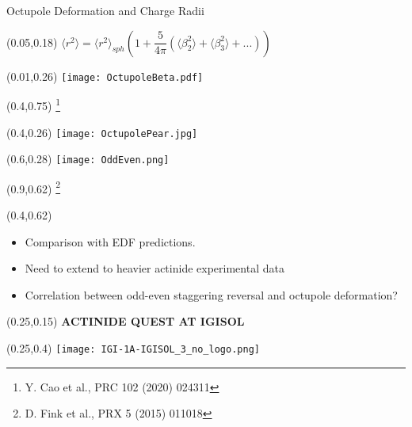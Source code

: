 \documentclass[10pt,aspectratio=169]{beamer}
\begin{document}
\begin{frame}{Octupole Deformation and Charge Radii}
	\begin{textblock*}{0.9\paperwidth}(0.05\paperwidth,0.18\paperheight)
		\centering
		$\langle r^2 \rangle = \langle r^2 \rangle_{sph} \left( 1+\dfrac{5}{4 \pi}\left( \langle \beta^2_2\rangle+\langle \beta^2_3\rangle+...\right)\right)$
	\end{textblock*}
	\begin{textblock*}{0.4\paperwidth}(0.01\paperwidth,0.26\paperheight)
		\texttt{[image: OctupoleBeta.pdf]}
	\end{textblock*}
	\begin{textblock*}{0.1\paperwidth}(0.4\paperwidth,0.75\paperheight)
		\footnote{Y. Cao et al., PRC 102 (2020) 024311}
	\end{textblock*}
	\begin{textblock*}{0.15\paperwidth}(0.4\paperwidth,0.26\paperheight)
		\texttt{[image: OctupolePear.jpg]}
	\end{textblock*}
	\begin{textblock*}{0.4\paperwidth}(0.6\paperwidth,0.28\paperheight)
		\texttt{[image: OddEven.png]}
	\end{textblock*}
	\begin{textblock*}{0.1\paperwidth}(0.9\paperwidth,0.62\paperheight)
		\footnote{D. Fink et al., PRX 5 (2015) 011018}
	\end{textblock*}
	\begin{textblock*}{0.6\paperwidth}(0.4\paperwidth,0.62\paperheight)
		\small	
		\begin{itemize}
				\item Comparison with EDF predictions. 
				\item Need to extend to heavier actinide experimental data
				\item Correlation between odd-even staggering reversal and octupole deformation?
			\end{itemize}
	\end{textblock*}
\end{frame}


\begin{SectionTitle}
	\begin{frame}
		\centering
		\begin{textblock*}{0.5\paperwidth}(0.25\paperwidth,0.15\paperheight)
			\centering
			\textbf{\LARGE ACTINIDE QUEST AT IGISOL}	
		\end{textblock*}
		\begin{textblock*}{0.5\paperwidth}(0.25\paperwidth,0.4\paperheight)
			\texttt{[image: IGI-1A-IGISOL\_3\_no\_logo.png]}
		\end{textblock*}
	\end{frame}
\end{SectionTitle}
\end{document}
